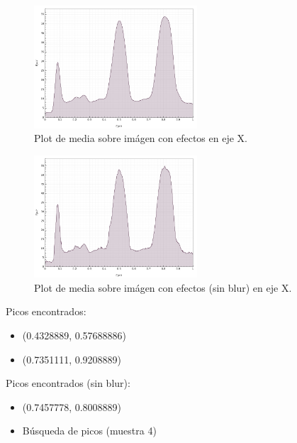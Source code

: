 \begin{figure}[H]
	 \vspace{-0.2cm}
	 \centering
	 \includegraphics[width=230px]{imagenes-jtlc/experimento/search-peaks/3/plot-x}
	 \centering
	 \caption{Plot de media sobre im\'agen con efectos en eje X.}
	 \label{fig:sp-3-plot-x}
	 \vspace{-0.15cm}
\end{figure}
\begin{figure}[H]
	\vspace{-0.2cm}
	\centering
	\includegraphics[width=230px]{imagenes-jtlc/experimento/search-peaks/3/plot-x-no-blur}
	\centering
	\caption{Plot de media sobre im\'agen con efectos (sin blur) en eje X.}
	\label{fig:sp-3-plot-x-no-blur}
	\vspace{-0.15cm}
\end{figure}

Picos encontrados:
\begin{itemize}
	\addtolength{\itemindent}{1cm}
	\item (0.4328889, 0.57688886)
	\item (0.7351111, 0.9208889)
\end{itemize}

Picos encontrados (sin blur):
\begin{itemize}
	\addtolength{\itemindent}{1cm}
	\item (0.7457778, 0.8008889)
\end{itemize}

	
\newpage
\begin{itemize}
	\item B\'usqueda de picos (muestra 4)
\end{itemize}
\vspace{-0.5cm}

